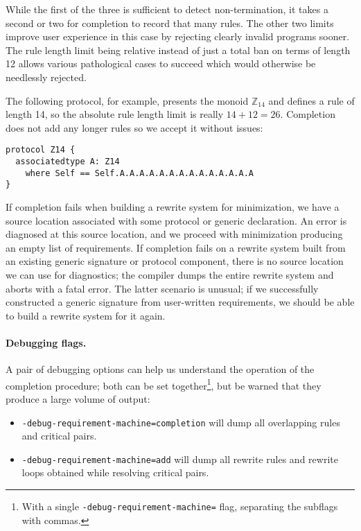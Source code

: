 \documentclass[../generics]{subfiles}
\begin{document}
While the first of the three is sufficient to detect non-termination, it takes a second or two for completion to record that many rules. The other two limits improve user experience in this case by rejecting clearly invalid programs sooner. The rule length limit being relative instead of just a total ban on terms of length 12 allows various pathological cases to succeed which would otherwise be needlessly rejected.

The following protocol, for example, presents the monoid $\mathbb{Z}_{14}$ and defines a rule of length 14, so the absolute rule length limit is really $14+12=26$. Completion does not add any longer rules so we accept it without issues:
\begin{Verbatim}
protocol Z14 {
  associatedtype A: Z14
    where Self == Self.A.A.A.A.A.A.A.A.A.A.A.A.A.A
}
\end{Verbatim}

If completion fails when building a rewrite system for minimization, we have a source location associated with some protocol or generic declaration. An error is diagnosed at this source location, and we proceed with minimization producing an empty list of requirements. If completion fails on a rewrite system built from an existing generic signature or protocol component, there is no source location we can use for diagnostics; the compiler dumps the entire rewrite system and aborts with a fatal error. The latter scenario is unusual; if we successfully constructed a generic signature from user-written requirements, we should be able to build a rewrite system for it again.

\paragraph{Debugging flags.}
A pair of debugging options can help us understand the operation of the completion procedure; both can be set together\footnote{With a single \texttt{-debug-requirement-machine=} flag, separating the subflags with commas.}, but be warned that they produce a large volume of output:
\begin{itemize}
\item {} \texttt{-debug-requirement-machine=completion} will dump all overlapping rules and critical pairs.
\item {} \texttt{-debug-requirement-machine=add} will dump all rewrite rules and rewrite loops obtained while resolving critical pairs.
\end{itemize}
\end{document}
